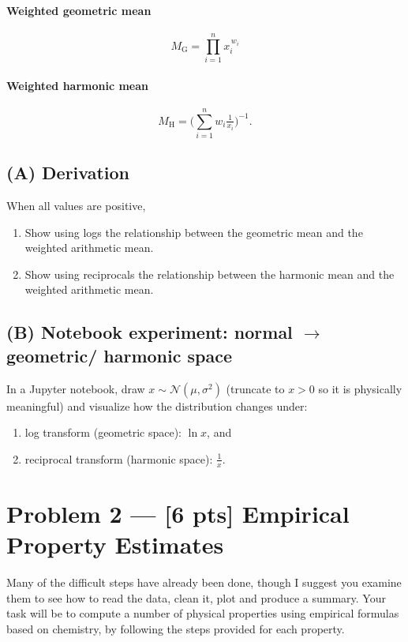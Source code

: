 \documentclass[11pt,a4paper]{article}
\newcommand{\geom}{\mathrm{G}}
\newcommand{\harm}{\mathrm{H}}
\begin{document}
\paragraph{Weighted geometric mean}
\[
    M_{\geom} = \prod_{i=1}^n x_i^{\,w_i}
\]

\paragraph{Weighted harmonic mean}
\[
    M_{\harm} = \Big(\sum_{i=1}^n w_i \tfrac{1}{x_i}\Big)^{-1}.
\]

\subsection*{(A) Derivation}
When all values are positive,
\begin{enumerate}[label=\textbf{\alph*.}]
    \item Show using logs the relationship between the geometric mean and the weighted arithmetic mean.
    \item Show using reciprocals the relationship between the harmonic mean and the weighted arithmetic mean.
\end{enumerate}


\subsection*{(B) Notebook experiment: normal $\to$ geometric/ harmonic space}
In a Jupyter notebook, draw $x \sim \mathcal N(\mu,\sigma^2)$ (truncate to $x>0$ so it is physically meaningful) and visualize how the distribution changes under:
\begin{enumerate}[itemsep=0.1em]
  \item log transform (geometric space): \(\ln x\), and
  \item reciprocal transform (harmonic space): \(\tfrac{1}{x}\).
\end{enumerate}


\section*{Problem 2 --- [6 pts] Empirical Property Estimates}
Many of the difficult steps have already been done, though I suggest you examine them to see how to read the data, clean it, plot and produce a summary.  Your task will be to compute a number of physical properties using empirical formulas based on chemistry, by following the steps provided for each property.
\end{document}
